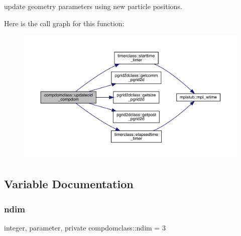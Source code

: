 update geometry parameters using new particle positions. 

Here is the call graph for this function\+:\nopagebreak
\begin{figure}[H]
\begin{center}
\leavevmode
\includegraphics[width=350pt]{namespacecompdomclass_abf3eab7526c06e30b574ddf8be378826_cgraph}
\end{center}
\end{figure}


\subsection{Variable Documentation}
\mbox{\label{namespacecompdomclass_a01f031d8af670f66db4484cd6411e99f}} 
\subsubsection{\texorpdfstring{ndim}{ndim}}
{\footnotesize\ttfamily integer, parameter, private compdomclass\+::ndim = 3\hspace{0.3cm}{\ttfamily [private]}}

